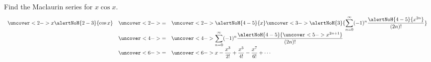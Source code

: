 \begin{frame}
\begin{example}
Find the Maclaurin series for $x\cos x$.
\abovedisplayskip=0pt
\belowdisplayskip=0pt
\[
\begin{array}{rcl}
\displaystyle \uncover<2->{%
x\alertNoH{ 2-3}{\cos x}%
}%
& \uncover<2->{=} &%
\displaystyle \uncover<2->{\alertNoH{ 4-5}{x}}%
\uncover<3->{%
\alertNoH{ 3}{\sum_{n=0}^\infty (-1)^n\frac{\alertNoH{ 4-5}{x^{2n}}}{(2n)!}}%
}\\%
& \uncover<4->{=} &%
\displaystyle \uncover<4->{%
\sum\limits_{n=0}^\infty (-1)^n\frac{\alertNoH{ 4-5}{\uncover<5->{x^{2n+1}}}}{(2n)!}%
}\\%
& \uncover<6->{=} &%
\displaystyle \uncover<6->{%
x - \frac{x^3}{2!} + \frac{x^5}{4!} - \frac{x^7}{6!} + \cdots%
}%
\end{array}
\]
\end{example}
\end{frame}
